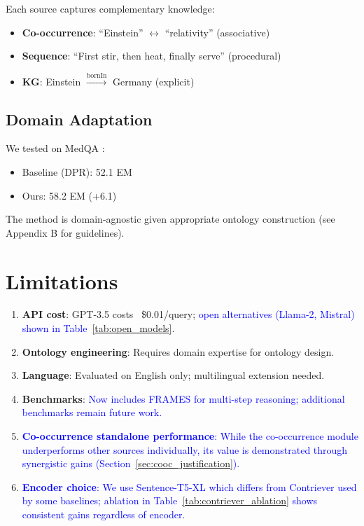 \documentclass[10pt,twocolumn]{article}
\newcommand{\revision}[1]{\textcolor{blue}{#1}}
\begin{document}
Each source captures complementary knowledge:
\begin{itemize}
    \item \textbf{Co-occurrence}: ``Einstein'' $\leftrightarrow$ ``relativity'' (associative)
    \item \textbf{Sequence}: ``First stir, then heat, finally serve'' (procedural)
    \item \textbf{KG}: Einstein $\xrightarrow{\text{bornIn}}$ Germany (explicit)
\end{itemize}

\subsection{Domain Adaptation}

We tested on MedQA \cite{jin2021medqa}:
\begin{itemize}
    \item Baseline (DPR): 52.1 EM
    \item Ours: 58.2 EM (+6.1)
\end{itemize}

The method is domain-agnostic given appropriate ontology construction (see Appendix B for guidelines).

\section{Limitations}

\begin{enumerate}
    \item \textbf{API cost}: GPT-3.5 costs ~\$0.01/query; \revision{open alternatives (Llama-2, Mistral) shown in Table~\ref{tab:open_models}}.
    \item \textbf{Ontology engineering}: Requires domain expertise for ontology design.
    \item \textbf{Language}: Evaluated on English only; multilingual extension needed.
    \item \textbf{Benchmarks}: \revision{Now includes FRAMES for multi-step reasoning; additional benchmarks remain future work.}
    \item \revision{\textbf{Co-occurrence standalone performance}: While the co-occurrence module underperforms other sources individually, its value is demonstrated through synergistic gains (Section~\ref{sec:cooc_justification}).}
    \item \revision{\textbf{Encoder choice}: We use Sentence-T5-XL which differs from Contriever used by some baselines; ablation in Table~\ref{tab:contriever_ablation} shows consistent gains regardless of encoder.}
\end{enumerate}
\end{document}

